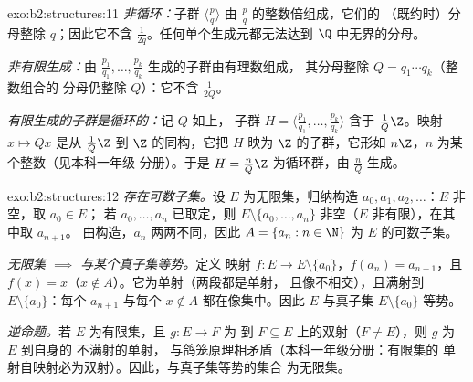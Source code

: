 \begin{solution}{exo:b2:structures:11}
\emph{非循环：}子群 $\langle \frac pq\rangle$ 由
$\frac pq$ 的整数倍组成，它们的
（既约时）分母整除 $q$；因此它不含
$\frac{1}{2q}$。任何单个生成元都无法达到
$\Q$ 中无界的分母。

\emph{非有限生成：}由
$\frac{p_1}{q_1}, \dots, \frac{p_k}{q_k}$ 生成的子群由有理数组成，
其分母整除 $Q = q_1 \cdots q_k$（整数组合的
分母仍整除 $Q$）：它不含 $\frac{1}{2Q}$。

\emph{有限生成的子群是循环的：}记 $Q$ 如上，
子群 $H = \langle \frac{p_1}{q_1}, \dots,
\frac{p_k}{q_k}\rangle$ 含于 $\frac{1}{Q}\Z$。映射 $x
\mapsto Qx$ 是从 $\frac1Q\Z$ 到 $\Z$ 的同构，它把
$H$ 映为 $\Z$ 的子群，它形如 $n\Z$，$n$ 为某个整数（见本科一年级
分册）。于是 $H = \frac{n}{Q}\Z$ 为循环群，由
$\frac nQ$ 生成。
\end{solution}

\begin{solution}{exo:b2:structures:12}
\emph{存在可数子集。}设 $E$ 为无限集，归纳构造 $a_0,
a_1, a_2, \dots$：$E$ 非空，取 $a_0 \in E$；
若 $a_0, \dots, a_n$ 已取定，则 $E \setminus \{a_0, \dots,
a_n\}$ 非空（$E$ 非有限），在其中取 $a_{n+1}$。
由构造，$a_n$ 两两不同，因此 $A = \{a_n : n
\in \N\}$ 为 $E$ 的可数子集。

\emph{无限集 $\implies$ 与某个真子集等势。}定义
映射 $f \colon E \to E \setminus \{a_0\}$，$f(a_n) = a_{n+1}$，且
$f(x) = x$（$x \notin A$）。它为单射（两段都是单射，
且像不相交），且满射到 $E \setminus
\{a_0\}$：每个 $a_{n+1}$ 与每个 $x \notin A$ 都在像集中。因此
$E$ 与真子集 $E \setminus \{a_0\}$ 等势。

\emph{逆命题。}若 $E$ 为有限集，且 $g \colon E \to F$ 为
到 $F \subseteq E$ 上的双射（$F \neq E$），则 $g$ 为 $E$ 到自身的
不满射的单射，
与鸽笼原理相矛盾（本科一年级分册：有限集的
单射自映射必为双射）。因此，与真子集等势的集合
为无限集。
\end{solution}

